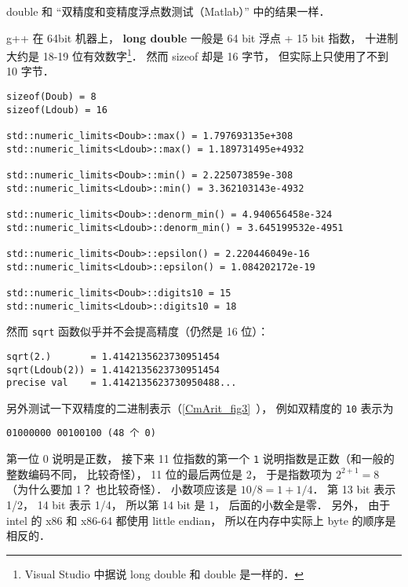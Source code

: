 
\begin{issues}
\issueDraft
\end{issues}


double 和 “双精度和变精度浮点数测试（Matlab）” 中的结果一样．

g++ 在 64bit 机器上， \textbf{long double} 一般是 64 bit 浮点 + 15 bit 指数， 十进制大约是 18-19 位有效数字\footnote{Visual Studio 中据说 long double 和 double 是一样的．}． 然而 sizeof 却是 16 字节， 但实际上只使用了不到 10 字节．

\begin{lstlisting}
sizeof(Doub) = 8
sizeof(Ldoub) = 16

std::numeric_limits<Doub>::max() = 1.797693135e+308
std::numeric_limits<Ldoub>::max() = 1.189731495e+4932

std::numeric_limits<Doub>::min() = 2.225073859e-308
std::numeric_limits<Ldoub>::min() = 3.362103143e-4932

std::numeric_limits<Doub>::denorm_min() = 4.940656458e-324
std::numeric_limits<Ldoub>::denorm_min() = 3.645199532e-4951

std::numeric_limits<Doub>::epsilon() = 2.220446049e-16
std::numeric_limits<Ldoub>::epsilon() = 1.084202172e-19

std::numeric_limits<Doub>::digits10 = 15
std::numeric_limits<Ldoub>::digits10 = 18
\end{lstlisting}

然而 \verb|sqrt| 函数似乎并不会提高精度（仍然是 16 位）：
\begin{lstlisting}
sqrt(2.)       = 1.4142135623730951454
sqrt(Ldoub(2)) = 1.4142135623730951454
precise val    = 1.4142135623730950488...
\end{lstlisting}

另外测试一下双精度的二进制表示（\autoref{CmArit_fig3}~）， 例如双精度的 \verb|10| 表示为
\begin{lstlisting}
01000000 00100100 (48 个 0)
\end{lstlisting}
第一位 0 说明是正数， 接下来 11 位指数的第一个 \verb|1| 说明指数是正数（和一般的整数编码不同， 比较奇怪）， 11 位的最后两位是 2， 于是指数项为 $2^{2+1} = 8$ （为什么要加 1？ 也比较奇怪）． 小数项应该是 $10/8 = 1+1/4$． 第 13 bit 表示 1/2， 14 bit 表示 1/4， 所以第 14 bit 是 1， 后面的小数全是零． 另外， 由于 intel 的 x86 和 x86-64 都使用 little endian， 所以在内存中实际上 byte 的顺序是相反的．

